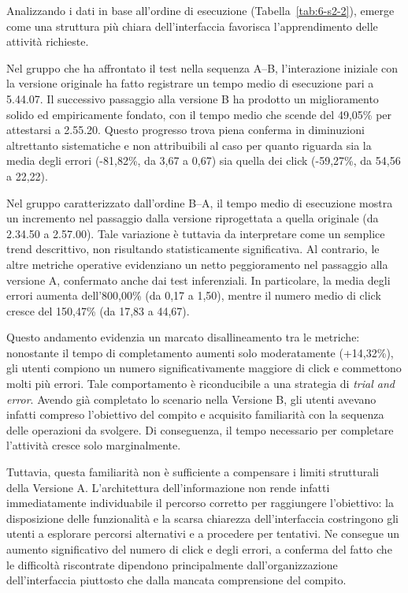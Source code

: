 Analizzando i dati in base all'ordine di esecuzione (Tabella~\ref{tab:6-s2-2}), emerge come una struttura più chiara dell'interfaccia favorisca l'apprendimento delle attività richieste.

Nel gruppo che ha affrontato il test nella sequenza A--B, l'interazione iniziale con la versione originale ha fatto registrare un tempo medio di esecuzione pari a 5.44.07. Il successivo passaggio alla versione B ha prodotto un miglioramento solido ed empiricamente fondato, con il tempo medio che scende del 49,05\% per attestarsi a 2.55.20. Questo progresso trova piena conferma in diminuzioni altrettanto sistematiche e non attribuibili al caso per quanto riguarda sia la media degli errori (-81,82\%, da 3,67 a 0,67) sia quella dei click (-59,27\%, da 54,56 a 22,22).

Nel gruppo caratterizzato dall'ordine B--A, il tempo medio di esecuzione mostra un incremento nel passaggio dalla versione riprogettata a quella originale (da 2.34.50 a 2.57.00). Tale variazione è tuttavia da interpretare come un semplice trend descrittivo, non risultando statisticamente significativa. Al contrario, le altre metriche operative evidenziano un netto peggioramento nel passaggio alla versione A, confermato anche dai test inferenziali. In particolare, la media degli errori aumenta dell'800,00\% (da 0,17 a 1,50), mentre il numero medio di click cresce del 150,47\% (da 17,83 a 44,67).

Questo andamento evidenzia un marcato disallineamento tra le metriche: nonostante il tempo di completamento aumenti solo moderatamente (+14,32\%), gli utenti compiono un numero significativamente maggiore di click e commettono molti più errori. Tale comportamento è riconducibile a una strategia di \textit{trial and error}. Avendo già completato lo scenario nella Versione B, gli utenti avevano infatti compreso l'obiettivo del compito e acquisito familiarità con la sequenza delle operazioni da svolgere. Di conseguenza, il tempo necessario per completare l'attività cresce solo marginalmente.

Tuttavia, questa familiarità non è sufficiente a compensare i limiti strutturali della Versione A. L'architettura dell'informazione non rende infatti immediatamente individuabile il percorso corretto per raggiungere l'obiettivo: la disposizione delle funzionalità e la scarsa chiarezza dell'interfaccia costringono gli utenti a esplorare percorsi alternativi e a procedere per tentativi. Ne consegue un aumento significativo del numero di click e degli errori, a conferma del fatto che le difficoltà riscontrate dipendono principalmente dall'organizzazione dell'interfaccia piuttosto che dalla mancata comprensione del compito.


